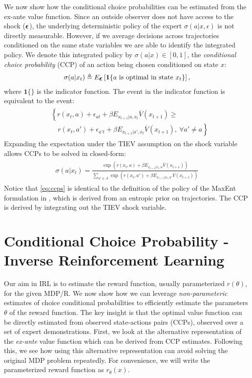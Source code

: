 \documentclass{article}
\renewcommand{\vec}[1]{\mbox{\bm{$#1$}}}
\begin{document}
We now show how the conditional choice probabilities can be estimated from the ex-ante value function.
Since an outside observer does not have access to the shock ($\vec{\epsilon}$), the underlying deterministic policy of the expert $\sigma(a | x,\epsilon)$ is not directly measurable. However, if we average decisions across trajectories conditioned on the same state variables we are able to identify the integrated policy. We denote this integrated policy by $\sigma(a|x)\in[0,1]$, the \emph{conditional choice probability} (CCP) of an action being chosen conditioned on state $x$: 
\begin{eqnarray}
\sigma(a|x_t)\triangleq E_{\vec{\epsilon}}\left[ \mathbf{1}\{a\ \textrm{is optimal in state }x_t\}\right],
\end{eqnarray}
where $\mathbf{1}\{\}$ is the indicator function. The event in the indicator function is equivalent to the event:
\begin{align}
\begin{split}
& \left\{r(x_t,a)+\epsilon_{at}+\beta E_{x_{t+1}|a,x_t} \overline{V}(x_{t+1})\geq \right. \\
& \quad \left. r(x_t,a')+\epsilon_{a't}+\beta E_{x_{t+1}|a',x_t} \overline{V}(x_{t+1}),\ \forall a'\neq a \right\}
\end{split}
\end{align}
Expanding the expectation under the TIEV assumption on the shock variable allows CCPs to be solved in closed-form:
\begin{align} \label{eq:ccps}
\begin{split}
\sigma(a|x_t)=\frac{\exp\left(r(x_t,a)+\beta E_{x_{t+1}|x_t,a} \overline{V}(x_{t+1})\right)}{\sum_{a'\in\mathcal{A}} \exp\left(r(x_t,a')+\beta E_{x_{t+1}|x_t,a'} \overline{V}(x_{t+1})\right)}
\end{split}
\end{align}
Notice that \eqref{eq:ccps} is identical to the definition of the policy of the MaxEnt formulation in \cite{ziebart_phd}, which is derived from an entropic prior on trajectories. The CCP is derived by integrating out the TIEV shock variable. 





\section{Conditional Choice Probability - Inverse Reinforcement Learning}

Our aim in IRL is to estimate the reward function, usually parameterized $r(\theta)$, for the given MDP/R. We now show how we can leverage \textit{non-parameteric} estimates of choice conditional probabilities to efficiently estimate the parameters $\theta$ of the reward function. The key insight is that the optimal value function can be directly estimated from observed state-actions pairs (CCPs), observed over a set of expert demonstrations.
First, we look at the alternative representation of the \emph{ex-ante} value function which can be derived from CCP estimates. Following this, we see how using this alternative representation can avoid solving the original MDP problem repeatedly.
For convenience, we will write the parameterized reward function as $r_{\theta}(x)$.
\end{document}

